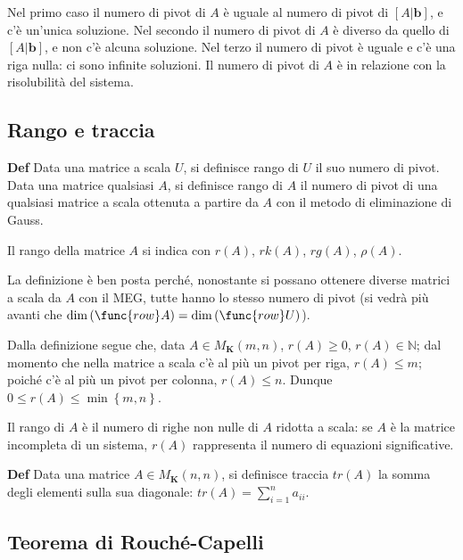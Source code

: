 \documentclass{article}
\begin{document}
\begin{enumerate}
Nel primo caso il numero di pivot di $A$ \`{e} uguale al numero di pivot di $%
\left[ A|\mathbf{b}\right] $, e c'\`{e} un'unica soluzione. Nel secondo il
numero di pivot di $A$ \`{e} diverso da quello di $\left[ A|\mathbf{b}\right]
$, e non c'\`{e} alcuna soluzione. Nel terzo il numero di pivot \`{e} uguale
e c'\`{e} una riga nulla: ci sono infinite soluzioni. Il numero di pivot di $%
A$ \`{e} in relazione con la risolubilit\`{a} del sistema.
\end{enumerate}

\subsection{Rango e traccia}

\textbf{Def} Data una matrice a scala $U$, si definisce rango di $U$ il suo
numero di pivot. Data una matrice qualsiasi $A$, si definisce rango di $A$
il numero di pivot di una qualsiasi matrice a scala ottenuta a partire da $A$
con il metodo di eliminazione di Gauss.

Il rango della matrice $A$ si indica con $r\left( A\right) $, $rk\left(
A\right) $, $rg\left( A\right) $, $\rho \left( A\right) $.

La definizione \`{e} ben posta perch\'{e}, nonostante si possano ottenere
diverse matrici a scala da $A$ con il MEG, tutte hanno lo stesso numero di
pivot (si vedr\`{a} pi\`{u} avanti che $\dim \left( \func{row}A\right) =\dim
\left( \func{row}U\right) $).

Dalla definizione segue che, data $A\in M_{\mathbf{K}}\left( m,n\right) $, $%
r\left( A\right) \geq 0$, $r\left( A\right) \in 
\mathbb{N}
$; dal momento che nella matrice a scala c'\`{e} al pi\`{u} un pivot per
riga, $r\left( A\right) \leq m$; poich\'{e} c'\`{e} al pi\`{u} un pivot per
colonna, $r\left( A\right) \leq n$. Dunque $0\leq r\left( A\right) \leq \min
\left\{ m,n\right\} $.

Il rango di $A$ \`{e} il numero di righe non nulle di $A$ ridotta a scala:
se $A$ \`{e} la matrice incompleta di un sistema, $r\left( A\right) $
rappresenta il numero di equazioni significative.

\textbf{Def} Data una matrice $A\in M_{\mathbf{K}}\left( n,n\right) $, si
definisce traccia $tr\left( A\right) $ la somma degli elementi sulla sua
diagonale: $tr\left( A\right) =\sum_{i=1}^{n}a_{ii}$.

\subsection{Teorema di Rouch\'{e}-Capelli}
\end{document}
